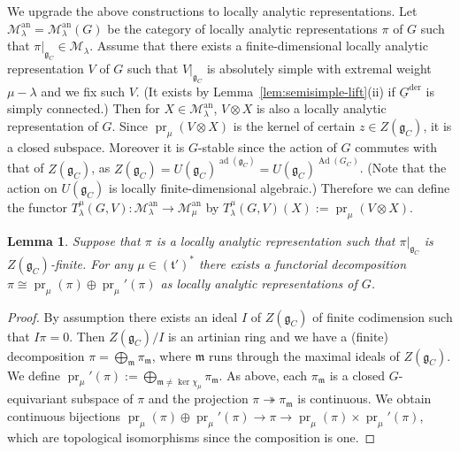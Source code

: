 \documentclass[a4paper]{amsart}
\numberwithin{equation}{section}
\newtheorem{lem}[thm]{Lemma}
\theoremstyle{remark}
\theoremstyle{definition}
\DeclareMathOperator{\Ad}{Ad}
\DeclareMathOperator{\ad}{ad}
\DeclareMathOperator{\pr}{pr}
\newcommand{\alggrp}[1]{\underline{#1}}
\newcommand{\an}{\mathrm{an}}
\newcommand{\der}{\mathrm{der}}
\newcommand{\onto}{\twoheadrightarrow}
\begin{document}
We upgrade the above constructions to locally analytic representations.
Let $\mathcal{M}^{\an}_{\lambda} = \mathcal{M}_{\lambda}^{\an}(G)$ be the category of locally analytic representations $\pi$ of $G$ such that $\pi|_{\mathfrak{g}_{C}}\in \mathcal{M}_{\lambda}$.
Assume that there exists a finite-dimensional locally analytic representation $V$ of $G$ such that $V|_{\mathfrak{g}_{C}}$ is absolutely simple with extremal weight $\mu - \lambda$ and we fix such $V$.
(It exists by Lemma~\ref{lem:semisimple-lift}(ii) if $\alggrp{G}^{\der}$ is simply connected.)
Then for $X\in \mathcal{M}^{\an}_{\lambda}$, $V\otimes X$ is also a locally analytic representation of $G$.
Since $\pr_{\mu}(V\otimes X)$ is the kernel of certain $z\in Z(\mathfrak{g}_{C})$, it is a closed subspace.
Moreover it is $G$-stable since the action of $G$ commutes with that of $Z(\mathfrak{g}_C)$, as $Z(\mathfrak{g}_{C}) = U(\mathfrak{g}_{C})^{\ad(\mathfrak{g}_{C})} = U(\mathfrak{g}_{C})^{\Ad(G_{C})}$. (Note that the action on $U(\mathfrak{g}_{C})$ is locally finite-dimensional algebraic.)
Therefore we can define the functor $T_{\lambda}^{\mu}(G,V)\colon \mathcal{M}_{\lambda}^{\an}\to \mathcal{M}_{\mu}^{\an}$ by $T_{\lambda}^{\mu}(G,V)(X) := \pr_{\mu}(V\otimes X)$.



\begin{lem}\label{lem:V-tensor-decomposition}
  Suppose that $\pi$ is a locally analytic representation such that   $\pi|_{\mathfrak{g}_{C}}$ is $Z(\mathfrak{g}_{C})$-finite.
  For any $\mu\in (\mathfrak{t}')^{*}$ there exists a functorial decomposition $\pi \cong \pr_{\mu}(\pi) \oplus \pr_\mu'(\pi)$ as locally analytic representations of $G$.
\end{lem}

\begin{proof}
  By assumption there exists an ideal $I$ of $Z(\mathfrak{g}_{C})$ of finite codimension such that $I\pi = 0$.
  Then $Z(\mathfrak{g}_{C})/I$ is an artinian ring and we have a (finite) decomposition $\pi = \bigoplus_{\mathfrak m} \pi_{\mathfrak m}$, where $\mathfrak m$ runs through the maximal ideals of $Z(\mathfrak{g}_{C})$.
  We define $\pr_\mu'(\pi) := \bigoplus_{\mathfrak m \ne \ker \chi_\mu} \pi_{\mathfrak m}$.
  As above, each $\pi_{\mathfrak m}$ is a closed $G$-equivariant subspace of $\pi$ and the projection $\pi \onto \pi_{\mathfrak m}$ is continuous.
  We obtain continuous bijections $\pr_{\mu}(\pi) \oplus \pr_\mu'(\pi) \to \pi \to \pr_{\mu}(\pi) \times \pr_\mu'(\pi)$, which are topological isomorphisms since the composition is one.
\end{proof}
\end{document}
